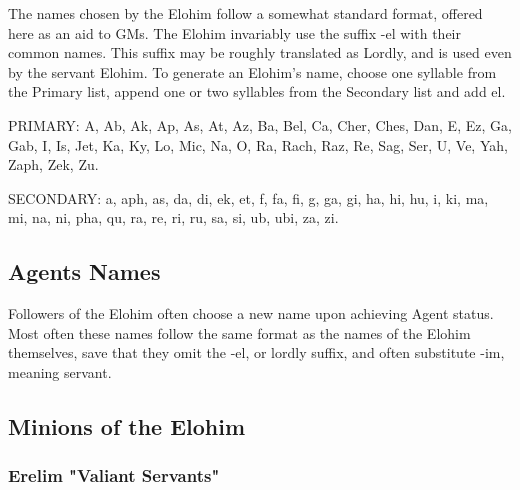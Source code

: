 The names chosen by the Elohim follow a somewhat standard format,
offered here as an aid to GMs.  The Elohim invariably use the suffix
-el with their common names.  This suffix may be roughly translated as
Lordly, and is used even by the servant Elohim.  To generate an
Elohim's name, choose one syllable from the Primary list, append one
or two syllables from the Secondary list and add el.

PRIMARY:
A, Ab, Ak, Ap, As, At, Az, Ba, Bel, Ca, Cher, Ches, Dan, E, Ez, Ga, Gab, I, Is, Jet, Ka, Ky, Lo, Mic, Na, O, Ra, Rach, Raz, Re, Sag, Ser, U, Ve, Yah, Zaph, Zek, Zu.

SECONDARY:
a, aph, as, da, di, ek, et, f, fa, fi, g, ga, gi, ha, hi, hu, i, ki, ma, mi, na, ni, pha, qu, ra, re, ri, ru, sa, si, ub, ubi, za, zi. 

\subsection{Agents Names}

Followers of the Elohim often choose a new name upon achieving Agent
status. Most often these names follow the same format as the names of
the Elohim themselves, save that they omit the -el, or lordly suffix,
and often substitute -im, meaning servant.

\subsection{Minions of the Elohim}

\subsubsection{Erelim "Valiant Servants"}

